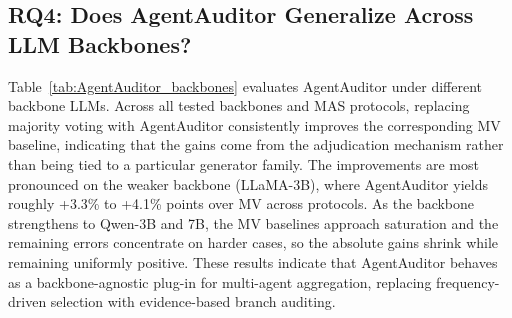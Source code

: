 \documentclass{article}
\theoremstyle{plain}
\theoremstyle{definition}
\theoremstyle{remark}
\begin{document}
\subsection{RQ4: Does AgentAuditor Generalize Across LLM Backbones?}
Table~\ref{tab:AgentAuditor_backbones} evaluates AgentAuditor under different backbone LLMs. Across all tested backbones and MAS protocols, replacing majority voting with AgentAuditor consistently improves the corresponding MV baseline, indicating that the gains come from the adjudication mechanism rather than being tied to a particular generator family. The improvements are most pronounced on the weaker backbone (LLaMA-3B), where AgentAuditor yields roughly +3.3\% to +4.1\% points over MV across protocols. As the backbone strengthens to Qwen-3B and 7B, the MV baselines approach saturation and the remaining errors concentrate on harder cases, so the absolute gains shrink while remaining uniformly positive. These results indicate that AgentAuditor behaves as a backbone-agnostic plug-in for multi-agent aggregation, replacing frequency-driven selection with evidence-based branch auditing.
\end{document}

